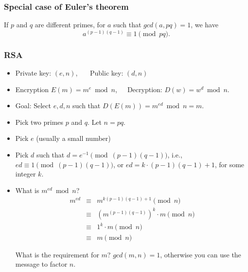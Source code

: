 \begin{frame}
  \frametitle{Special case of Euler's theorem}

  \begin{theorem}
    If $p$ and $q$ are different primes, for $a$ such that $gcd(a,pq)=1$, we have
    \[
    a^{(p-1)(q-1)} \equiv 1 \pmod{pq}.
    \]
  \end{theorem}

  \vspace{0.2in}
   
\end{frame}

\begin{frame}
  \frametitle{RSA}

  \begin{tcolorbox}
  {\footnotesize
  \begin{itemize}
  \item Private key: $(e,n)$, \ \ \  Public key: $(d,n)$
  \item Encryption $E(m) = m^{e} \bmod n$,\ \ \  Decryption: $D(w) = w^{d} \bmod n$.
  \item Goal: Select $e,d,n$ such that $D(E(m)) = m^{ed}\bmod n = m$.
  \end{itemize}
  }
  \end{tcolorbox}
  
  \vspace{0.1in}
  \pause
  {\footnotesize
  \begin{itemize}
  \item Pick two primes $p$ and $q$.  Let $n=pq$.
  \item Pick $e$ (usually a small number)
  \item Pick $d$ such that $d = e^{-1} \pmod{(p-1)(q-1)}$, i.e., $ed\equiv 1 \pmod{(p-1)(q-1)}$, or $ed = k\cdot(p-1)(q-1) + 1$, for some integer $k$.
  \item What is $m^{ed}\bmod n$? \pause
    \begin{eqnarray*}
      m^{ed} &\equiv& m^{k(p-1)(q-1)+1} \pmod n\\
      &\equiv& (m^{(p-1)(q-1)})^k\cdot m \pmod n\\
      &\equiv& 1^k\cdot m \pmod n\\
      &\equiv& m \pmod n
    \end{eqnarray*}
    \pause

    What is the requirement for $m$?  \pause $gcd(m,n)=1$, otherwise
    you can use the message to factor $n$.
  \end{itemize}
  }
  \vspace{0.5in}
\end{frame}
